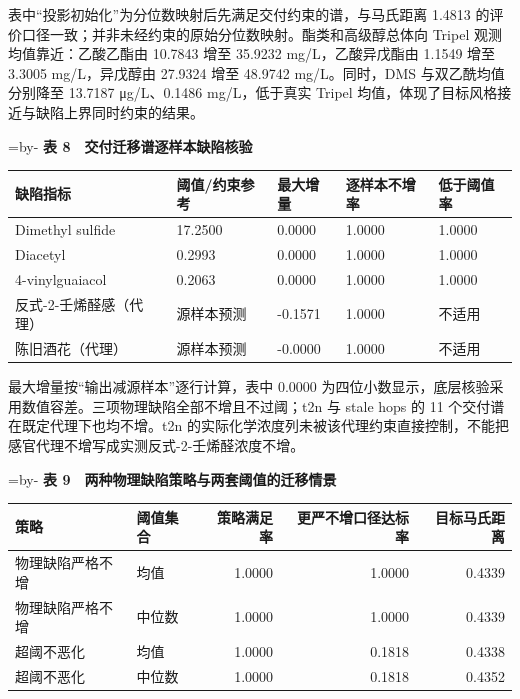 \documentclass[
  chinese,
  11pt,
]{article}
\makeatletter
\newcounter{none} %
\newcommand{\EnsureSpace}[1]{\par\begingroup\@tempdima=\pagegoal\advance\@tempdima by-\pagetotal\ifdim\@tempdima<#1\newpage\fi\endgroup}
\makeatother
\begin{document}
表中``投影初始化''为分位数映射后先满足交付约束的谱，与马氏距离 1.4813
的评价口径一致；并非未经约束的原始分位数映射。酯类和高级醇总体向 Tripel
观测均值靠近：乙酸乙酯由 10.7843 增至 35.9232 mg/L，乙酸异戊酯由 1.1549
增至 3.3005 mg/L，异戊醇由 27.9324 增至 48.9742 mg/L。同时，DMS
与双乙酰均值分别降至 13.7187 μg/L、0.1486 mg/L，低于真实 Tripel
均值，体现了目标风格接近与缺陷上界同时约束的结果。

\EnsureSpace{6\baselineskip}
\textbf{表 8　交付迁移谱逐样本缺陷核验}

{\def\LTcaptype{none} %
\begin{longtable}[]{@{}lllll@{}}
\toprule\noalign{}
缺陷指标 & 阈值/约束参考 & 最大增量 & 逐样本不增率 & 低于阈值率 \\
\midrule\noalign{}
\endhead
\bottomrule\noalign{}
\endlastfoot
Dimethyl sulfide & 17.2500 & 0.0000 & 1.0000 & 1.0000 \\
Diacetyl & 0.2993 & 0.0000 & 1.0000 & 1.0000 \\
4-vinylguaiacol & 0.2063 & 0.0000 & 1.0000 & 1.0000 \\
反式-2-壬烯醛感（代理） & 源样本预测 & -0.1571 & 1.0000 & 不适用 \\
陈旧酒花（代理） & 源样本预测 & -0.0000 & 1.0000 & 不适用 \\
\end{longtable}
}

最大增量按``输出减源样本''逐行计算，表中 0.0000
为四位小数显示，底层核验采用数值容差。三项物理缺陷全部不增且不过阈；t2n
与 stale hops 的 11 个交付谱在既定代理下也均不增。t2n
的实际化学浓度列未被该代理约束直接控制，不能把感官代理不增写成实测反式-2-壬烯醛浓度不增。

\EnsureSpace{6\baselineskip}
\textbf{表 9　两种物理缺陷策略与两套阈值的迁移情景}

{\def\LTcaptype{none} %
\begin{longtable}[]{@{}llrrr@{}}
\toprule\noalign{}
策略 & 阈值集合 & 策略满足率 & 更严不增口径达标率 & 目标马氏距离 \\
\midrule\noalign{}
\endhead
\bottomrule\noalign{}
\endlastfoot
物理缺陷严格不增 & 均值 & 1.0000 & 1.0000 & 0.4339 \\
物理缺陷严格不增 & 中位数 & 1.0000 & 1.0000 & 0.4339 \\
超阈不恶化 & 均值 & 1.0000 & 0.1818 & 0.4338 \\
超阈不恶化 & 中位数 & 1.0000 & 0.1818 & 0.4352 \\
\end{longtable}
}
\end{document}

